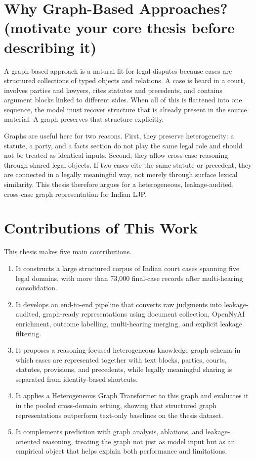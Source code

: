 \section{Why Graph-Based Approaches? (motivate your core thesis before describing it)}

A graph-based approach is a natural fit for legal disputes because cases are structured collections of typed objects and relations. A case is heard in a court, involves parties and lawyers, cites statutes and precedents, and contains argument blocks linked to different sides. When all of this is flattened into one sequence, the model must recover structure that is already present in the source material. A graph preserves that structure explicitly.

Graphs are useful here for two reasons. First, they preserve heterogeneity: a statute, a party, and a facts section do not play the same legal role and should not be treated as identical inputs. Second, they allow cross-case reasoning through shared legal objects. If two cases cite the same statute or precedent, they are connected in a legally meaningful way, not merely through surface lexical similarity. This thesis therefore argues for a heterogeneous, leakage-audited, cross-case graph representation for Indian LJP.

\section{Contributions of This Work}

This thesis makes five main contributions.

\begin{enumerate}
    \item It constructs a large structured corpus of Indian court cases spanning five legal domains, with more than 73{,}000 final-case records after multi-hearing consolidation.

    \item It develops an end-to-end pipeline that converts raw judgments into leakage-audited, graph-ready representations using document collection, OpenNyAI enrichment, outcome labelling, multi-hearing merging, and explicit leakage filtering.

    \item It proposes a reasoning-focused heterogeneous knowledge graph schema in which cases are represented together with text blocks, parties, courts, statutes, provisions, and precedents, while legally meaningful sharing is separated from identity-based shortcuts.

    \item It applies a Heterogeneous Graph Transformer to this graph and evaluates it in the pooled cross-domain setting, showing that structured graph representations outperform text-only baselines on the thesis dataset.

    \item It complements prediction with graph analysis, ablations, and leakage-oriented reasoning, treating the graph not just as model input but as an empirical object that helps explain both performance and limitations.
\end{enumerate}

